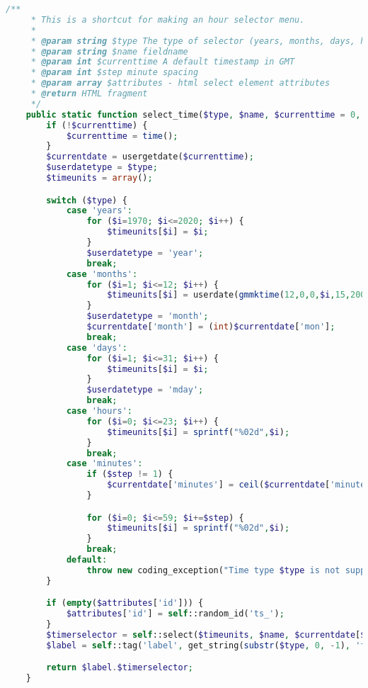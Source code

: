 \begin{lstlisting}[language=PHP]
    /**
     * This is a shortcut for making an hour selector menu.
     *
     * @param string $type The type of selector (years, months, days, hours, minutes)
     * @param string $name fieldname
     * @param int $currenttime A default timestamp in GMT
     * @param int $step minute spacing
     * @param array $attributes - html select element attributes
     * @return HTML fragment
     */
    public static function select_time($type, $name, $currenttime = 0, $step = 5, array $attributes = null) {
        if (!$currenttime) {
            $currenttime = time();
        }
        $currentdate = usergetdate($currenttime);
        $userdatetype = $type;
        $timeunits = array();

        switch ($type) {
            case 'years':
                for ($i=1970; $i<=2020; $i++) {
                    $timeunits[$i] = $i;
                }
                $userdatetype = 'year';
                break;
            case 'months':
                for ($i=1; $i<=12; $i++) {
                    $timeunits[$i] = userdate(gmmktime(12,0,0,$i,15,2000), "%B");
                }
                $userdatetype = 'month';
                $currentdate['month'] = (int)$currentdate['mon'];
                break;
            case 'days':
                for ($i=1; $i<=31; $i++) {
                    $timeunits[$i] = $i;
                }
                $userdatetype = 'mday';
                break;
            case 'hours':
                for ($i=0; $i<=23; $i++) {
                    $timeunits[$i] = sprintf("%02d",$i);
                }
                break;
            case 'minutes':
                if ($step != 1) {
                    $currentdate['minutes'] = ceil($currentdate['minutes']/$step)*$step;
                }

                for ($i=0; $i<=59; $i+=$step) {
                    $timeunits[$i] = sprintf("%02d",$i);
                }
                break;
            default:
                throw new coding_exception("Time type $type is not supported by html_writer::select_time().");
        }

        if (empty($attributes['id'])) {
            $attributes['id'] = self::random_id('ts_');
        }
        $timerselector = self::select($timeunits, $name, $currentdate[$userdatetype], null, array('id'=>$attributes['id']));
        $label = self::tag('label', get_string(substr($type, 0, -1), 'form'), array('for'=>$attributes['id'], 'class'=>'accesshide'));

        return $label.$timerselector;
    }


\end{lstlisting}
